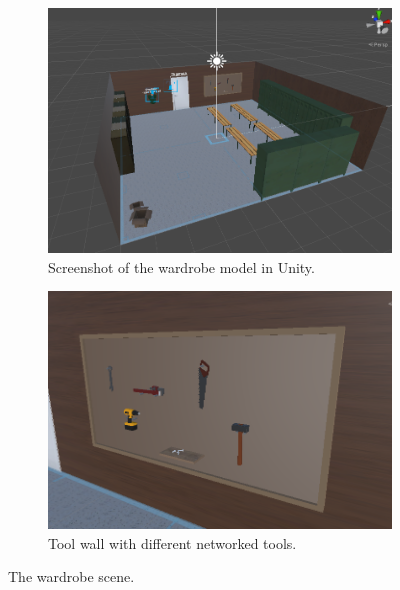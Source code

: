 \begin{figure}[]
  \centering
  \begin{subfigure}[b]{0.9\textwidth}
    \includegraphics[width=1\textwidth]{fig/phase_2/implementation/wardrobe.PNG}
    \caption{Screenshot of the wardrobe model in Unity.}
    \label{fig:wardrobeApp}
  \end{subfigure}
  \hfill%
  \begin{subfigure}[b]{0.7\textwidth}
    \includegraphics[width=1\textwidth]{fig/phase_2/implementation/toolsWall.PNG}
    \caption{Tool wall with different networked tools.}
    \label{fig:toolWall}
  \end{subfigure}
  \hfill%
  \caption{The wardrobe scene.}
  \label{fig:phase2Wardrobe}
\end{figure}


